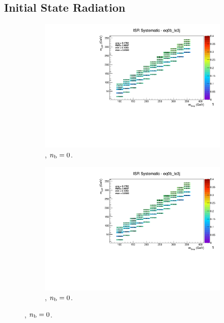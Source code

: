 \newpage
\subsection*{Initial State Radiation}
\label{sec:t2cc_isr_plots}

\begin{figure}[ht!]
  \centering
  \begin{subfigure}[b]{0.32\textwidth}
    \includegraphics[width=\textwidth, page=14]{Figs/sms/t2cc/v37_3/systs/T2cc_ISR_eq0b_le3j.pdf}
    \caption{\njlow, $n_{\text{b}} = 0$.}
  \end{subfigure}
  \begin{subfigure}[b]{0.32\textwidth}
    \includegraphics[width=\textwidth, page=9]{Figs/sms/t2cc/v37_3/systs/T2cc_ISR_eq0b_le3j.pdf}
    \caption{\njlow, $n_{\text{b}} = 0$.}
  \end{subfigure}

\end{figure}
